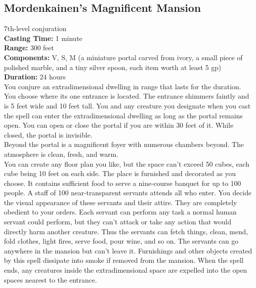 \documentclass[11pt, A4paper, english]{article}
\begin{document}
		\subsection{Mordenkainen's Magnificent Mansion}
7th-level conjuration \\
\textbf{Casting Time:} 1 minute \\
\textbf{Range:} 300 feet \\
\textbf{Components:} V, S, M (a miniature portal carved from ivory, a small piece of polished marble, and a tiny silver spoon, each item worth at least 5 gp) \\
\textbf{Duration:} 24 hours \\
You conjure an extradimensional dwelling in range that lasts for the duration. You choose where its one entrance is located. The entrance shimmers faintly and is 5 feet wide and 10 feet tall. You and any creature you designate when you cast the spell can enter the extradimensional dwelling as long as the portal remains open. You can open or close the portal if you are within 30 feet of it. While closed, the portal is invisible. \\
Beyond the portal is a magnificent foyer with numerous chambers beyond. The atmosphere is clean, fresh, and warm. \\
You can create any floor plan you like, but the space can’t exceed 50 cubes, each cube being 10 feet on each side. The place is furnished and decorated as you choose. It contains sufficient food to serve a nine-course banquet for up to 100 people. A staff of 100 near-transparent servants attends all who enter. You decide the visual appearance of these servants and their attire. They are completely obedient to your orders. Each servant can perform any task a normal human servant could perform, but they can’t attack or take any action that would directly harm another creature. Thus the servants can fetch things, clean, mend, fold clothes, light fires, serve food, pour wine, and so on. The servants can go anywhere in the mansion but can’t leave it. Furnishings and other objects created by this spell dissipate into smoke if removed from the mansion. When the spell ends, any creatures inside the extradimensional space are expelled into the open spaces nearest to the entrance.
\end{document}
